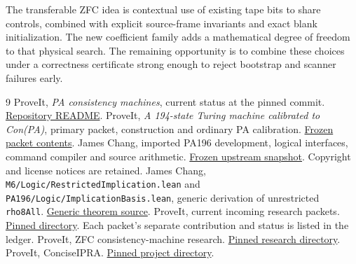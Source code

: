\documentclass[10pt,letterpaper]{article}
\newcommand{\file}[1]{\nolinkurl{#1}}
\begin{document}
The transferable ZFC idea is contextual use of existing tape bits to share controls, combined with explicit source-frame invariants and exact blank initialization. The new coefficient family adds a mathematical degree of freedom to that physical search. The remaining opportunity is to combine these choices under a correctness certificate strong enough to reject bootstrap and scanner failures early.

\begin{thebibliography}{9}
 ProveIt, \emph{PA consistency machines}, current status at the pinned commit. \href{https://github.com/VladimirReshetnikov/ProveIt/blob/17f92105e2bc4317feae6c219cb2143437b482ff/Computability/BusyBeaver/Research/PA/README.md}{Repository README}.
 ProveIt, \emph{A 194-state Turing machine calibrated to Con(PA)}, primary packet, construction and ordinary PA calibration. \href{https://github.com/VladimirReshetnikov/ProveIt/tree/17f92105e2bc4317feae6c219cb2143437b482ff/Computability/BusyBeaver/Research/PA/docs/pa194_conpa_2026-11-13}{Frozen packet contents}.
 James Chang, imported PA196 development, logical interfaces, command compiler and source arithmetic. \href{https://github.com/VladimirReshetnikov/ProveIt/tree/17f92105e2bc4317feae6c219cb2143437b482ff/Computability/BusyBeaver/Research/PA/jamesyc-upstream/pa196}{Frozen upstream snapshot}. Copyright and license notices are retained.
 James Chang, \file{M6/Logic/RestrictedImplication.lean} and \file{PA196/Logic/ImplicationBasis.lean}, generic derivation of unrestricted \file{rho8All}. \href{https://github.com/VladimirReshetnikov/ProveIt/blob/17f92105e2bc4317feae6c219cb2143437b482ff/Computability/BusyBeaver/Research/PA/jamesyc-upstream/pa196/M6/Logic/RestrictedImplication.lean}{Generic theorem source}.
 ProveIt, current incoming research packets. \href{https://github.com/VladimirReshetnikov/ProveIt/tree/17f92105e2bc4317feae6c219cb2143437b482ff/docs/incoming}{Pinned directory}. Each packet's separate contribution and status is listed in the ledger.
 ProveIt, ZFC consistency-machine research. \href{https://github.com/VladimirReshetnikov/ProveIt/tree/17f92105e2bc4317feae6c219cb2143437b482ff/Computability/BusyBeaver/Research/ZFC}{Pinned research directory}.
 ProveIt, ConciseIPRA. \href{https://github.com/VladimirReshetnikov/ProveIt/tree/17f92105e2bc4317feae6c219cb2143437b482ff/Logic/PrimitiveRecursiveArithmetic/ConciseIPRA}{Pinned project directory}.
\end{thebibliography}
\end{document}
